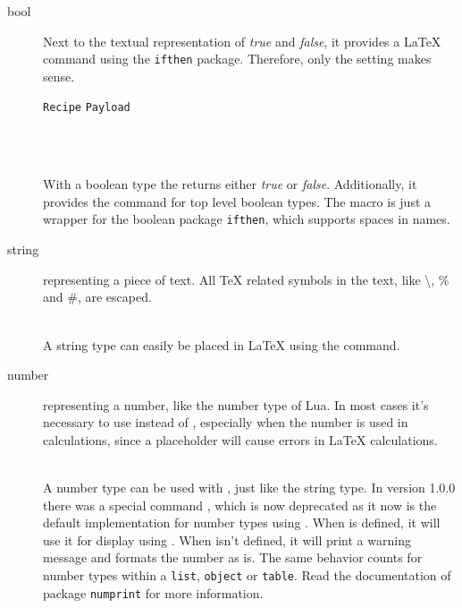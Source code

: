 \documentclass{ltxdoc}
\newcommand\showexample[5][15pt]{%
\begin{minipage}[t]{.5\linewidth - .5 \columnsep}%

\end{minipage}\hspace*{\columnsep}%
\begin{minipage}[t]{.5\linewidth - .5 \columnsep}%

\end{minipage}\\%
}
\begin{document}
    \begin{description}
        \item[bool] Next to the textual representation of \textit{true} and \textit{false}, it provides a \LaTeX{} command using the \texttt{ifthen} package.
        Therefore, only the  setting makes sense.\\[5pt]
        \hspace*{5pt}\parbox{\linewidth-5pt}{%
            \hfill\texttt{Recipe}\hfill\hspace*{\columnsep}%
            \hfill\texttt{Payload}\hfill\hspace*{\columnsep}}\\%
        \showexample{1}{1-3}{1}{1-1}
        \DescribeMacro{\param}
        With a boolean type the \cmd{\param} returns either \textit{true} or \textit{false}.
        \DescribeMacro{\ifparam}
        Additionally, it provides the \cmd{\ifparam} command for top level boolean types.
        The macro is just a wrapper for the boolean package \texttt{ifthen}, which supports spaces in names.
        \item[string] representing a piece of text.
        All \TeX{} related symbols in the text, like \textbackslash, \% and \#, are escaped.\\
        \showexample{4}{4-6}{2}{2-2}
        \DescribeMacro{\param} A string type can easily be placed in \LaTeX{} using the \cmd{\param} command.
        \item[number] representing a number, like the number type of Lua.
        In most cases it's necessary to use  instead of , especially when the number is used in calculations, since a placeholder will cause errors in \LaTeX{} calculations.\\
        \showexample{7}{7-9}{3}{3-3}
        \DescribeMacro{\param}
        A number type can be used with \cmd{\param}, just like the string type.
        In version 1.0.0 there was a special command \cmd{\numparam}, which is now deprecated as it now is the default implementation for number types using \cmd{\param}.
        When \cmd{\numprint} is defined, it will use it for display using \cmd{\param}.
        When \cmd{\numprint} isn't defined, it will print a warning message and formats the number as is.
        The same behavior counts for number types within a \texttt{list}, \texttt{object} or \texttt{table}.
        Read the documentation of package \texttt{numprint} for more information.

\end{description}
\end{document}
